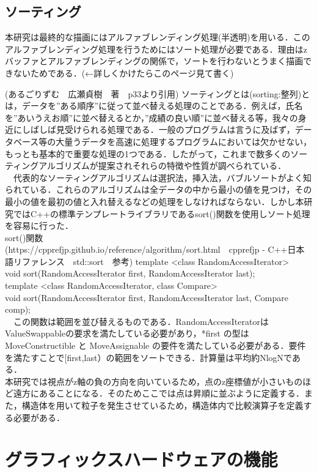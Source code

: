 \documentclass[11pt]{jreport}
\begin{document}
\subsection{ソーティング}
本研究は最終的な描画にはアルファブレンディング処理(半透明)を用いる．このアルファブレンディング処理を行うためにはソート処理が必要である．理由はzバッファとアルファブレンディングの関係で，ソートを行わないとうまく描画できないためである．(←詳しくかけたらこのページ見て書く)

(あるごりずむ　広瀬貞樹　著　p33より引用)
ソーティングとは(sorting:整列)とは，データを”ある順序”に従って並べ替える処理のことである．例えば，氏名を”あいうえお順”に並べ替えるとか，”成績の良い順”に並べ替える等，我々の身近にしばしば見受けられる処理である．一般のプログラムは言うに及ばず，データベース等の大量うデータを高速に処理するプログラムにおいては欠かせない，もっとも基本的で重要な処理の1つである．したがって，これまで数多くのソーティングアルゴリズムが提案されそれらの特徴や性質が調べられている．\\
　代表的なソーティングアルゴリズムは選択法，挿入法，バブルソートがよく知られている．これらのアルゴリズムは全データの中から最小の値を見つけ，その最小の値を最初の値と入れ替えるなどの処理をしなければならない．しかし本研究ではC++の標準テンプレートライブラリであるsort()関数を使用しソート処理を容易に行った．\\
sort()関数\\(https://cpprefjp.github.io/reference/algorithm/sort.html　cpprefjp - C++日本語リファレンス　std::sort　参考)
  template <class RandomAccessIterator>\\
  void sort(RandomAccessIterator first, RandomAccessIterator last);\\
  template <class RandomAccessIterator, class Compare>\\
  void sort(RandomAccessIterator first, RandomAccessIterator last, Compare comp);\\
　この関数は範囲を並び替えるものである．RandomAccessIteratorはValueSwappableの要求を満たしている必要があり，*first の型は MoveConstructible と MoveAssignable の要件を満たしている必要がある．要件を満たすことで[first,last）の範囲をソートできる．計算量は平均約NlogNである．\\
本研究では視点がz軸の負の方向を向いているため，点のz座標値が小さいものほど遠方にあることになる．そのためここでは点は昇順に並ぶように定義する．また，構造体を用いて粒子を発生させているため，構造体内で比較演算子を定義する必要がある．


\section{グラフィックスハードウェアの機能}
\end{document}
